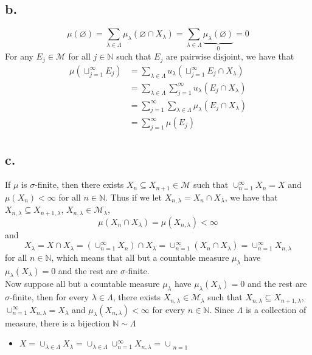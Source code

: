 \documentclass[11pt]{article}
\theoremstyle{mystyle}
\theoremstyle{definition}
\begin{document}
\subsection*{b.}
\[ 
  \mu(\varnothing) = \sum_{\lambda \in \Lambda} \mu_\lambda(\varnothing \cap X_\lambda) = \sum_{\lambda \in \Lambda} \underbrace{\mu_\lambda(\varnothing)}_{0} = 0 
\]
For any $E_j \in \mathcal{M}$ for all $j \in \mathbb{N}$ such that $E_j$ are pairwise disjoint, we have that 
\begin{align*}
  \mu(\sqcup_{j=1}^\infty E_j) 
  &= \sum_{\lambda \in \Lambda} u_\lambda (\sqcup_{j=1}^\infty E_j \cap X_\lambda) \\
  &= \sum_{\lambda \in \Lambda} \sum_{j=1}^\infty u_\lambda(E_j \cap X_\lambda) \\ 
  &= \sum_{j=1}^\infty \sum_{\lambda \in \Lambda} \mu_\lambda (E_j \cap X_\lambda) \\
  &= \sum_{j=1}^\infty \mu(E_j)
\end{align*}
\subsection*{c.}
If $\mu$ is $\sigma$-finite, then there exists $X_n \subseteq X_{n+1} \in \mathcal{M}$ such that $\cup_{n=1}^\infty X_n = X$ and $\mu(X_n) < \infty$ for all $n \in \mathbb{N}$. Thus if we let $X_{n, \lambda} = X_n \cap X_\lambda$, we have that $X_{n, \lambda} \subseteq X_{n+1, \lambda}$, $X_{n, \lambda} \in \mathcal{M}_\lambda$,  
\[
  \mu(X_n \cap X_\lambda) = \mu(X_{n, \lambda}) < \infty 
\]
and 
\[
  X_\lambda = X \cap X_\lambda = \left(\cup_{n=1}^\infty X_n \right) \cap X_\lambda = \cup_{n=1}^\infty (X_n \cap X_\lambda) = \cup_{n=1}^\infty X_{n, \lambda} 
\]
for all $n \in \mathbb{N}$, which means that all but a countable measure $\mu_\lambda$ have $\mu_\lambda(X_\lambda) = 0$ and the rest are $\sigma$-finite. \\
Now suppose all but a countable measure $\mu_\lambda$ have $\mu_\lambda(X_\lambda) = 0$ and the rest are $\sigma$-finite, then for every $\lambda \in \Lambda$, there exists $X_{n, \lambda} \in \mathcal{M}_\lambda$ such that $X_{n, \lambda} \subseteq X_{n+1, \lambda}$, $\cup_{n=1}^\infty X_{n, \lambda} = X_\lambda$ and $\mu_\lambda(X_{n, \lambda}) < \infty$ for every $n \in \mathbb{N}$. Since $\Lambda$ is a collection of measure, there is a bijection $\mathbb{N} \sim \Lambda$   
\begin{itemize}
  \item $X = \cup_{\lambda \in \Lambda} X_\lambda = \cup_{\lambda \in \Lambda} \cup_{n=1}^\infty X_{n, \lambda} = \cup_{\substack{n=1 \\}} $  
\end{itemize}
\newpage
\end{document}
